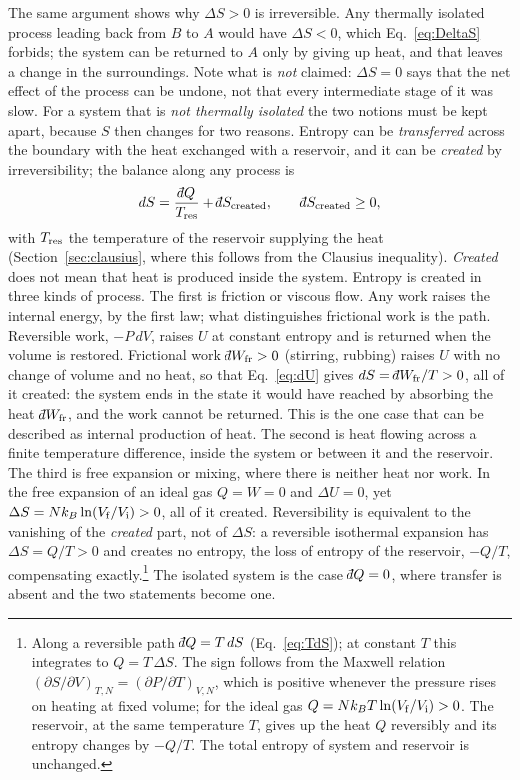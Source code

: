\documentclass[10pt,a4paper]{article}
\theoremstyle{remark}
\newcommand{\dbar}{\mathchar'26\mkern-11mu d}
\begin{document}
The same argument shows why $\Delta S>0$ is irreversible. Any thermally
isolated process leading back from $B$ to $A$ would have $\Delta S<0$, which
Eq.~\eqref{eq:DeltaS} forbids; the system can be returned to $A$ only by
giving up heat, and that leaves a change in the surroundings. Note what is
\emph{not} claimed: $\Delta S=0$ says that the net effect of the process can
be undone, not that every intermediate stage of it was slow. For a
system that is \emph{not thermally isolated} the two notions must be kept apart,
because $S$ then changes for two reasons. Entropy can be \emph{transferred}
across the boundary with the heat exchanged with a reservoir,
and it can be \emph{created} by irreversibility; the balance along any process is
\[
  dS=\frac{\dbar Q}{T_{\rm res}}+\dbar S_{\rm created} ,\qquad
  \dbar S_{\rm created}\geq0 ,
\]
with $T_{\rm res}$ the temperature of the reservoir supplying the heat
(Section~\ref{sec:clausius}, where this follows from the Clausius inequality).
\emph{Created} does not mean that heat is produced inside the system. Entropy
is created in three kinds of process. The first is friction or viscous flow.
Any work raises the internal energy, by the first law; what distinguishes
frictional work is the path. Reversible work, $-P\,dV$, raises $U$ at constant
entropy and is returned when the volume is restored. Frictional work
$\dbar W_{\rm fr}>0$ (stirring, rubbing) raises $U$ with no change of volume
and no heat, so that Eq.~\eqref{eq:dU} gives
$dS=\dbar W_{\rm fr}/T>0$, all of it created: the system ends in the state it
would have reached by absorbing the heat $\dbar W_{\rm fr}$, and the work
cannot be returned. This is the one case that can be described as internal
production of heat. The second is heat flowing across a finite
temperature difference, inside the system or between it and the reservoir. The
third is free expansion or mixing, where there is neither heat nor work. In the free
expansion of an ideal gas $Q=W=0$ and $\Delta U=0$, yet
$\Delta S=Nk_B\ln(V_{\rm f}/V_{\rm i})>0$, all of it created.
Reversibility is equivalent to the vanishing of the \emph{created} part, not
of $\Delta S$: a reversible isothermal expansion has $\Delta S=Q/T>0$ and
creates no entropy, the loss of entropy of the reservoir, $-Q/T$,
compensating exactly.\footnote{Along a reversible path $\dbar Q=T\,dS$
(Eq.~\eqref{eq:TdS}); at constant $T$ this integrates to $Q=T\,\Delta S$. The
sign follows from the Maxwell relation
$(\partial S/\partial V)_{T,N}=(\partial P/\partial T)_{V,N}$, which is
positive whenever the pressure rises on heating at fixed volume; for the ideal
gas $Q=Nk_BT\ln(V_{\rm f}/V_{\rm i})>0$. The reservoir, at the same temperature
$T$, gives up the heat $Q$ reversibly and its entropy changes by $-Q/T$. The
total entropy of system and reservoir is unchanged.} The isolated system is the case $\dbar Q=0$, where transfer is
absent and the two statements become one.
\end{document}
